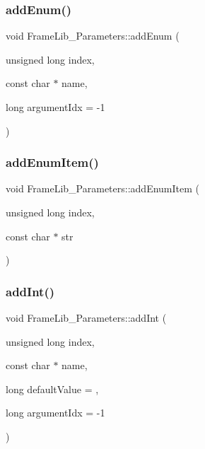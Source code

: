 \subsubsection{\texorpdfstring{add\+Enum()}{addEnum()}}
{\footnotesize\ttfamily void Frame\+Lib\+\_\+\+Parameters\+::add\+Enum (\begin{DoxyParamCaption}\item[{unsigned long}]{index,  }\item[{const char $\ast$}]{name,  }\item[{long}]{argument\+Idx = {\ttfamily -\/1} }\end{DoxyParamCaption})\hspace{0.3cm}{\ttfamily [inline]}}

\mbox{\label{class_frame_lib___parameters_a9840a17de7f4c3078d26f23ec88eb02d}} 
\subsubsection{\texorpdfstring{add\+Enum\+Item()}{addEnumItem()}}
{\footnotesize\ttfamily void Frame\+Lib\+\_\+\+Parameters\+::add\+Enum\+Item (\begin{DoxyParamCaption}\item[{unsigned long}]{index,  }\item[{const char $\ast$}]{str }\end{DoxyParamCaption})\hspace{0.3cm}{\ttfamily [inline]}}

\mbox{\label{class_frame_lib___parameters_a9cb86d9fa829686a58e7776dcc45b60a}} 
\subsubsection{\texorpdfstring{add\+Int()}{addInt()}}
{\footnotesize\ttfamily void Frame\+Lib\+\_\+\+Parameters\+::add\+Int (\begin{DoxyParamCaption}\item[{unsigned long}]{index,  }\item[{const char $\ast$}]{name,  }\item[{long}]{default\+Value = {},  }\item[{long}]{argument\+Idx = {\ttfamily -\/1} }\end{DoxyParamCaption})\hspace{0.3cm}{\ttfamily [inline]}}

